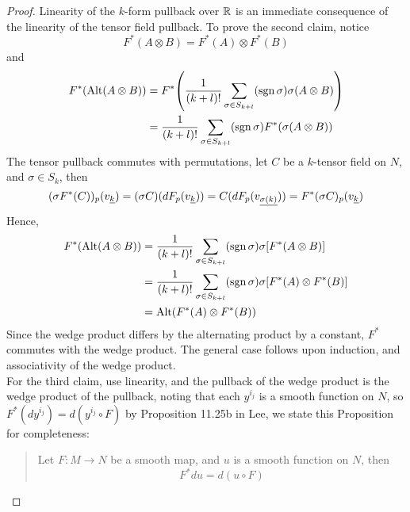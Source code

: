 \documentclass[../main-manifolds.tex]{subfiles}
\begin{document}
    \begin{proof}
        Linearity of the $k$-form pullback over $\mathbb{R}$ is an immediate consequence of the linearity of the tensor field pullback. To prove the second claim, notice 
        \[
            F^*(A\otimes B) = F^*(A)\otimes F^*(B)
        \]
        and
        \begin{align*}
            F^*(\operatorname{Alt}(A\otimes B)) &= F^*\qty(\dfrac{1}{(k+l)!}\sum_{\sigma\in S_{k+l}}(\operatorname{sgn}\sigma)\sigma(A\otimes B))\\
            &= \dfrac{1}{(k+l)!}\sum_{\sigma\in S_{k+l}}(\operatorname{sgn}\sigma)F^*(\sigma(A\otimes B))
        \end{align*}
        The tensor pullback commutes with permutations, let $C$ be a $k$-tensor field on $N$, and $\sigma\in S_k$, then
        \[
            (\sigma F^*(C))_p(\Ul{v}[k]) = (\sigma C) (dF_p(\Ul{v}[k])) = C(dF_p(\Ul{v}[\sigma(k)])) = F^*(\sigma C)_p(\Ul{v}[k])
        \]
        Hence,
        \begin{align*}
            F^*(\operatorname{Alt}(A\otimes B)) &= \dfrac{1}{(k+l)!}\sum_{\sigma\in S_{k+l}}(\operatorname{sgn}\sigma)\sigma\qty[ F^*(A\otimes B)]\\
            &= \dfrac{1}{(k+l)!}\sum_{\sigma\in S_{k+l}}(\operatorname{sgn}\sigma)\sigma\qty[ F^*(A)\otimes F^*(B)]\\
            &= \operatorname{Alt}(F^*(A)\otimes F^*(B))
        \end{align*}
        Since the wedge product differs by the alternating product by a constant, $F^*$ commutes with the wedge product. The general case follows upon induction, and associativity of the wedge product.\\

        For the third claim, use linearity, and the pullback of the wedge product is the wedge product of the pullback, noting that each $y^{i_j}$ is a smooth function on $N$, so $F^*(dy^{i_j}) = d(y^{i_j}\circ F)$ by Proposition 11.25b in Lee, we state this Proposition for completeness:

        \begin{quote}
            Let $F:M\to N$ be a smooth map, and $u$ is a smooth function on $N$, then
            \[
                F^*du = d(u\circ F)
            \]
        \end{quote}
        
    \end{proof}
\end{document}
